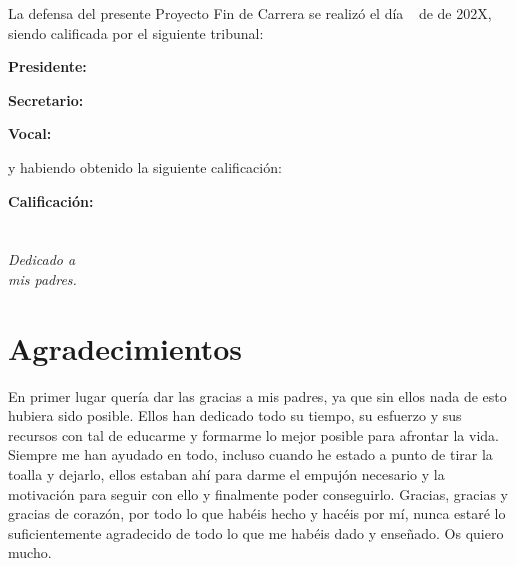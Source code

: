 \documentclass[a4paper, 12pt]{book}
\begin{document}
\vspace{1cm}
La defensa del presente Proyecto Fin de Carrera se realizó el día \qquad$\;\,$ de \qquad\qquad\qquad\qquad \newline de 202X, siendo calificada por el siguiente tribunal:


\vspace{0.5cm}
\textbf{Presidente:}

\vspace{1.2cm}
\textbf{Secretario:}

\vspace{1.2cm}
\textbf{Vocal:}


\vspace{1.2cm}
y habiendo obtenido la siguiente calificación:

\vspace{1cm}
\textbf{Calificación:}


\vspace{1cm}
\begin{flushright}
\label{sec:Github}
\end{flushright}


\chapter*{}
\begin{flushright}
\textit{Dedicado a \\
mis padres.}
\end{flushright}


\chapter*{Agradecimientos}

En primer lugar quería dar las gracias a mis padres, ya que sin ellos nada de esto hubiera sido posible. Ellos han dedicado todo su tiempo, su esfuerzo y sus recursos con tal de educarme y formarme lo mejor posible para afrontar la vida. Siempre me han ayudado en todo, incluso cuando he estado a punto de tirar la toalla y dejarlo, ellos estaban ahí para darme el empujón necesario y la motivación para seguir con ello y finalmente poder conseguirlo. Gracias, gracias y gracias de corazón, por todo lo que habéis hecho y hacéis por mí, nunca estaré lo suficientemente agradecido de todo lo que me habéis dado y enseñado. Os quiero mucho.
\end{document}
